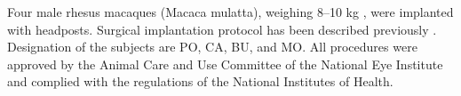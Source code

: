 Four male rhesus macaques (Macaca mulatta), weighing 8–10 kg%
, were implanted with headposts. 
Surgical implantation protocol has been described previously \citep{lafer-sousa_parallel_2013}. %
Designation of the subjects are PO, CA, BU, and MO. %
All procedures were approved by the Animal Care and Use Committee of the National Eye Institute and complied with the regulations of the National Institutes of Health.